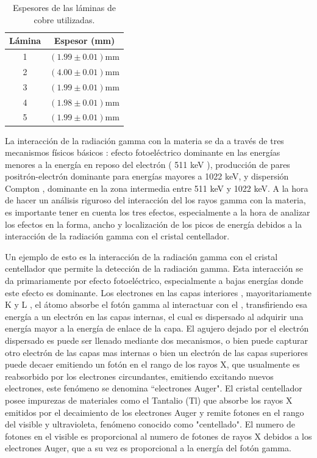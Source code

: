 \documentclass[twoside]{article}
\begin{document}
\begin{multicols}{2}
\begin{table}[H]
    \centering
    \begin{tabular}{c|c}
         \hline
         Lámina & Espesor (mm) \\
         \hline 
         1 &  $(1.99 \pm 0.01)$mm\\\hline
         2 & $(4.00 \pm 0.01)$mm \\ \hline
         3 & $(1.99 \pm 0.01)$mm \\ \hline
         4 & $(1.98 \pm 0.01)$mm \\ \hline
         5 & $(1.99 \pm 0.01)$mm \\ \hline
         
    \end{tabular}
    \caption{Espesores de las láminas de cobre utilizadas.}
    \label{espesores}
\end{table}


\iffalse
La interacción de la radiación gamma con la materia se da a través de tres mecanismos físicos básicos : efecto fotoeléctrico dominante en las energías menores a la energía en reposo del electrón ( 511 keV ), producción de pares positrón-electrón dominante para energías mayores a 1022 keV, y dispersión Compton , dominante en la zona intermedia entre 511 keV y 1022 keV. A la hora de hacer un análisis riguroso del interacción del los rayos gamma con la materia, es importante tener en cuenta los tres efectos, especialmente a la hora de analizar los efectos en la forma, ancho y localización de los picos de energía debidos a la interacción de la radiación gamma con el cristal centellador.

Un ejemplo de esto es la interacción de la radiación gamma con el cristal centellador que permite la detección de la radiación gamma. Esta interacción se da primariamente por efecto fotoeléctrico, especialmente a bajas energías donde este efecto es dominante. Los electrones en las capas interiores , mayoritariamente K y L , el átomo absorbe el fotón gamma al interactuar con el , transfiriendo esa energía a un electrón en las capas internas, el cual es dispersado al adquirir una energía mayor a la energía de enlace de la capa. El agujero dejado por el electrón dispersado es puede ser llenado mediante dos mecanismos, o bien puede capturar otro electrón de las capas mas internas o bien un electrón de las capas superiores puede decaer emitiendo un fotón en el rango de los rayos X, que usualmente es reabsorbido por los electrones circundantes, emitiendo excitando nuevos electrones, este fenómeno se denomina ``electrones Auger". El cristal centellador posee impurezas de materiales como el Tantalio (Tl) que absorbe los rayos X emitidos por el decaimiento de los electrones Auger y remite fotones en el rango del visible y ultravioleta, fenómeno conocido como "centellado". El numero de fotones en el visible es proporcional al numero de fotones de rayos X debidos a los electrones Auger, que a su vez es proporcional a la energía del fotón gamma.


\end{multicols}
\end{document}
